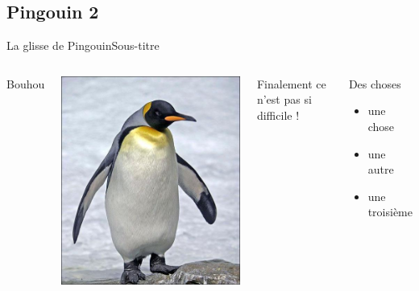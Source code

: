 \documentclass[usenames,dvipsnames, 12pt]{beamer}
\begin{document}
 \subsection{Pingouin 2}
 \begin{frame}{La glisse de Pingouin}{Sous-titre}
	\begin{columns}	
	\begin{center}
		Bouhou
	\end{center}
	\includegraphics[angle = 90, width = 1.\textwidth]{Pingouin}
	
  Finalement ce n'est pas si difficile !
  		\begin{block}{Des choses}
  			\begin{itemize}
  			\item<1-3>	une chose
  			\item<2>	une autre
  			\item<3>	une troisième
  			\end{itemize}
  		\end{block}
  		\end{columns}
 \end{frame}
\end{document}

